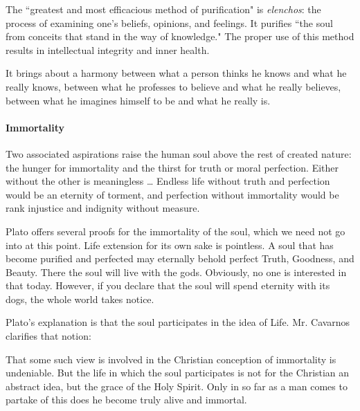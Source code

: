 The ``greatest and most efficacious method of purification" is \emph{elenchos}: the process of examining one's beliefs, opinions, and feelings. It purifies ``the soul from conceits that stand in the way of knowledge." The proper use of this method results in intellectual integrity and inner health.

\begin{quotex}
It brings about a harmony between what a person thinks he knows and what he really knows, between what he professes to believe and what he really believes, between what he imagines himself to be and what he really is. 

\end{quotex}
\paragraph{Immortality}
\begin{quotex}
Two associated aspirations raise the human soul above the rest of created nature: the hunger for immortality and the thirst for truth or moral perfection. Either without the other is meaningless … Endless life without truth and perfection would be an eternity of torment, and perfection without immortality would be rank injustice and indignity without measure. 

\end{quotex}
Plato offers several proofs for the immortality of the soul, which we need not go into at this point. Life extension for its own sake is pointless. A soul that has become purified and perfected may eternally behold perfect Truth, Goodness, and Beauty. There the soul will live with the gods. Obviously, no one is interested in that today. However, if you declare that the soul will spend eternity with its dogs, the whole world takes notice.

Plato's explanation is that the soul participates in the idea of Life. Mr. Cavarnos clarifies that notion:

\begin{quotex}
That some such view is involved in the Christian conception of immortality is undeniable. But the life in which the soul participates is not for the Christian an abstract idea, but the grace of the Holy Spirit. Only in so far as a man comes to partake of this does he become truly alive and immortal. 

\end{quotex}

\hfill

